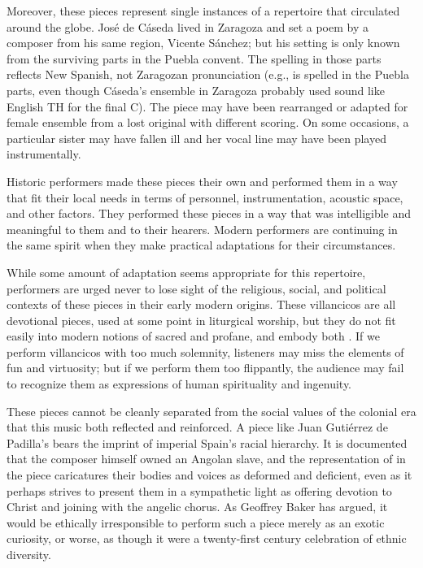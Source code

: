 Moreover, these pieces represent single instances of a repertoire that
circulated around the globe. 
José de Cáseda lived in Zaragoza and set a poem by a composer from his same
region, Vicente Sánchez; but his setting is only known from the surviving parts
in the Puebla convent.
The spelling in those parts reflects New Spanish, not Zaragozan pronunciation
(e.g.,  is spelled  in the
Puebla parts, even though Cáseda's ensemble in Zaragoza probably used sound like
English TH for the final C).
The piece may have been rearranged or adapted for female ensemble from a lost
original with different scoring.
On some occasions, a particular sister may have fallen ill and her vocal line
may have been played instrumentally.

Historic performers made these pieces their own and performed them in a way
that fit their local needs in terms of personnel, instrumentation, acoustic
space, and other factors.
They performed these pieces in a way that was intelligible and meaningful to
them and to their hearers.
Modern performers are continuing in the same spirit when they make practical
adaptations for their circumstances.

While some amount of adaptation seems appropriate for this repertoire,
performers are urged never to lose sight of the religious, social, and political
contexts of these pieces in their early modern origins.
These villancicos are all devotional pieces, used at some point in liturgical
worship, but they do not fit easily into modern notions of sacred and profane,
and embody both .%
    \Autocite{Cashner:Cards}
If we perform villancicos with too much solemnity, listeners may miss the
elements of fun and virtuosity;
but if we perform them too flippantly, the audience may fail to recognize them
as expressions of human spirituality and ingenuity.

These pieces cannot be cleanly separated from the social values of the colonial
era that this music both reflected and reinforced.
A piece like Juan Gutiérrez de Padilla's 
bears the imprint of imperial Spain's racial hierarchy. 
It is documented that the composer himself owned an Angolan slave,%
    \Autocite{Mauleon:PadillaCivil}
and the representation of  in the piece caricatures their
bodies and voices as deformed and deficient, even as it perhaps strives to
present them in a sympathetic light as offering devotion to Christ and joining
with the angelic chorus.
As Geoffrey Baker has argued, it would be ethically irresponsible to perform
such a piece merely as an exotic curiosity, or worse, as though it were a
twenty-first century celebration of ethnic diversity.%
    \Autocite{Baker:PerformancePostColonial}

